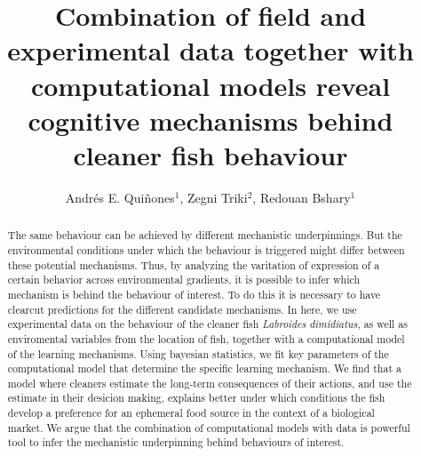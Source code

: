 \documentclass[]{rsos}%
\begin{document}
\title{Combination of field and experimental data together with computational models reveal cognitive mechanisms behind cleaner fish behaviour}

\author{
Andrés E. Quiñones$^{1}$,
Zegni Triki$^{2}$,
Redouan Bshary$^{1}$}

\address{
  $^{1}$Institute of Biology, University of Neuchâtel, Neuchâtel, Switzerland\\
  $^{2}$Department of Zoology, Stockholm University, Stockholm, Sweden}
\subject{
Behavioural ecology,
Cognitive ecology,
Animal behaviour}



\begin{abstract}
The same behaviour can be achieved by different mechanistic underpinnings. But the environmental conditions under which the behaviour is triggered might differ between these potential mechanisms. Thus, by analyzing the varitation of expression of a certain behavior across environmental gradients, it is possible to infer which mechanism is behind the behaviour of interest. To do this it is necessary to have clearcut predictions for the different candidate mechanisms. In here, we use experimental data on the behaviour of the cleaner fish \emph{Labroides} \emph{dimidiatus}, as well as enviromental variables from the location of fish, together with a computational model of the learning mechanisms. Using bayesian statistics, we fit key parameters of the computational model that determine the specific learning mechanism. We find that a model where cleaners estimate the long-term consequences of their actions, and use the estimate in their desicion making, explains better under which conditions the fish develop a preference for an ephemeral food source in the context of a biological market. We argue that the combination of computational models with data is powerful tool to infer the mechanistic underpinning behind behaviours of interest.
\end{abstract}

\providecommand{\tightlist}{%
  \setlength{\itemsep}{0pt}\setlength{\parskip}{0pt}}
\providecommand{\EndFirstPage}{%
}
\end{document}
